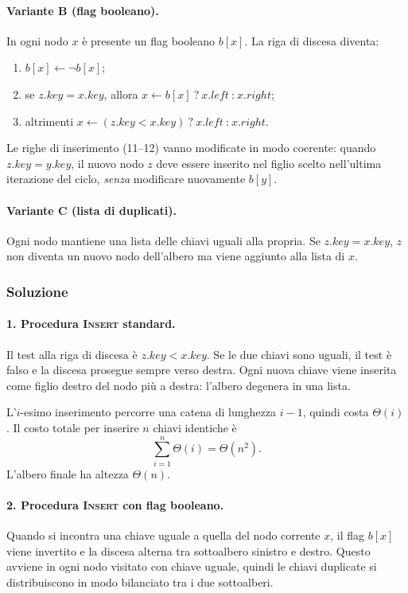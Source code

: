 \paragraph{Variante B (flag booleano).}
In ogni nodo $x$ è presente un flag booleano $b[x]$. La riga di discesa diventa:
\begin{enumerate}
	\item $b[x] \leftarrow \lnot b[x]$;
	\item se $z.\mathit{key} = x.\mathit{key}$, allora
	$x \leftarrow b[x]\ \textbf{?}\ x.\mathit{left}\ \textbf{:}\ x.\mathit{right}$;
	\item altrimenti $x \leftarrow (z.\mathit{key} < x.\mathit{key})\ \textbf{?}\ x.\mathit{left}\ \textbf{:}\ x.\mathit{right}$.
\end{enumerate}
Le righe di inserimento (11--12) vanno modificate in modo coerente: quando
$z.\mathit{key} = y.\mathit{key}$, il nuovo nodo $z$ deve essere inserito nel figlio
scelto nell'ultima iterazione del ciclo, \emph{senza} modificare nuovamente $b[y]$.

\paragraph{Variante C (lista di duplicati).}
Ogni nodo mantiene una lista delle chiavi uguali alla propria. Se $z.\mathit{key} = x.\mathit{key}$,
$z$ non diventa un nuovo nodo dell'albero ma viene aggiunto alla lista di $x$.

\subsubsection*{Soluzione}

\paragraph{1. Procedura \textsc{Insert} standard.}
Il test alla riga di discesa è $z.\mathit{key} < x.\mathit{key}$. Se le due chiavi sono
uguali, il test è falso e la discesa prosegue sempre verso destra. Ogni nuova chiave viene
inserita come figlio destro del nodo più a destra: l'albero degenera in una lista.

L'$i$-esimo inserimento percorre una catena di lunghezza $i-1$, quindi costa $\Theta(i)$.
Il costo totale per inserire $n$ chiavi identiche è
\[
\sum_{i=1}^{n} \Theta(i) = \Theta(n^2).
\]
L'albero finale ha altezza $\Theta(n)$.

\paragraph{2. Procedura \textsc{Insert} con flag booleano.}
Quando si incontra una chiave uguale a quella del nodo corrente $x$, il flag $b[x]$ viene
invertito e la discesa alterna tra sottoalbero sinistro e destro. Questo avviene in ogni
nodo visitato con chiave uguale, quindi le chiavi duplicate si distribuiscono in modo
bilanciato tra i due sottoalberi.

